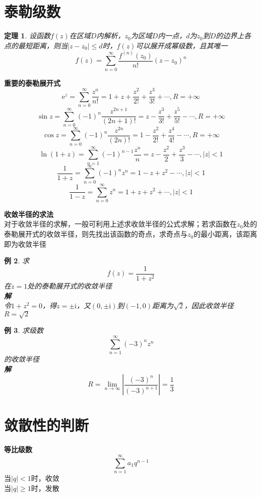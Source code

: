 \documentclass[12pt, a4paper, twoside]{ctexbook}
\newtheorem{theorem}{定理}[section]
\newtheorem{example}[theorem]{例}
\begin{document}
\section{泰勒级数}
\begin{theorem}
	设函数$f\left(z\right)$在区域$D$内解析，$z_0$为区域$D$内一点，$d$为$z_0$到$D$的边界上各点的最短距离，则当$\left|z-z_0\right|\leqslant d$时，$f\left(z\right)$可以展开成幂级数，且其唯一
	$$
	f\left(z\right)=\sum_{n=0}^{\infty}{\frac{f^{(n)}\left(z_0\right)}{n!}\left(z-z_0\right)^n}
	$$
\end{theorem}
\textbf{重要的泰勒展开式}
$$
\mathrm{e}^z=\sum_{n=0}^{\infty}\frac{z^n}{n!}=1+z+\frac{z^2}{2!}+\frac{z^3}{3!}+\cdots,R=+\infty
$$
$$
\sin z = \sum_{n=0}^{\infty}(-1)^n\frac{z^{2n+1}}{(2n+1)!}=z-\frac{z^3}{3!}+\frac{z^5}{5!}-\cdots,R=+\infty
$$
$$
\cos z = \sum_{n=0}^{\infty}(-1)^n\frac{z^{2n}}{(2n)!}=1-\frac{z^2}{2!}+\frac{z^4}{4!}-\cdots,R=+\infty
$$
$$
\ln\left(1+z\right)=\sum_{n=1}^{\infty}(-1)^{n-1}\frac{z^n}{n}=z-\frac{z^2}{2}+\frac{z^3}{3}-\cdots,\left|z\right|<1
$$
$$
\frac{1}{1+z}=\sum_{n=0}^{\infty}(-1)^nz^n=1-z+z^2-\cdots,\left|z\right|<1
$$
$$
\frac{1}{1-z}=\sum_{n=0}^{\infty}z^n=1+z+z^2+\cdots,\left|z\right|<1
$$

\textbf{收敛半径的求法}\\
对于收敛半径的求解，一般可利用上述求收敛半径的公式求解；若求函数在$z_0$处的泰勒展开式的收敛半径，则先找出该函数的奇点，求奇点与$z_0$的最小距离，该距离即为收敛半径
\begin{example}
	求
	$$
	f\left(z\right)=\frac{1}{1+z^2}
	$$
	\hspace*{2em}在$z=1$处的泰勒展开式的收敛半径\\
	\hspace*{1em}\textbf{解}\\
	\hspace*{2em}令$1+z^2=0$，得$z=\pm \mathrm{i}$，又$\left(0,\pm \mathrm{i}\right)$到$\left(-1,0\right)$距离为$\sqrt{2}$，因此收敛半径$R=\sqrt{2}$
\end{example}
\begin{example}
	求级数
	$$
	\sum_{n=1}^{\infty}\left(-3\right)^nz^n
	$$
	\hspace*{2em}的收敛半径\\
	\hspace*{1em}\textbf{解}
	$$
	R=\lim_{n\to \infty}\left|\frac{\left(-3\right)^n}{\left(-3\right)^{n+1}}\right|=\frac{1}{3}
	$$
\end{example}
\section{敛散性的判断}
\textbf{等比级数}
$$
\sum_{n=1}^{\infty}a_1q^{n-1}
$$
\hspace*{3em}当$\left|q\right|<1$时，收敛\\
\hspace*{3em}当$\left|q\right|\geqslant1$时，发散\\
\end{document}
